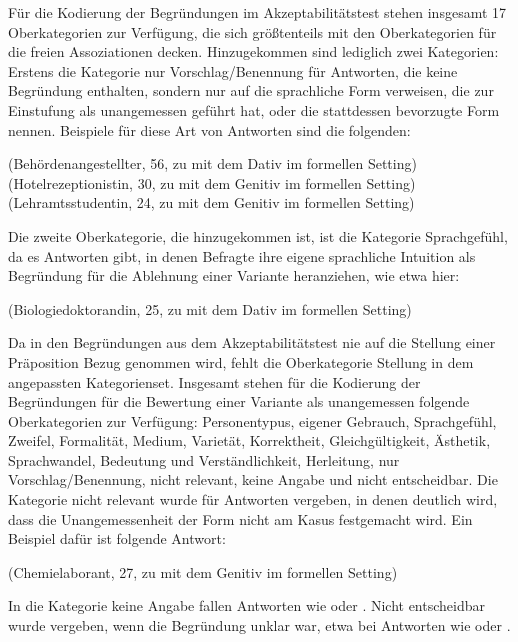 Für die Kodierung der Begründungen im Akzeptabilitätstest stehen insgesamt 17 Oberkategorien zur Verfügung, die sich größtenteils mit den Oberkategorien für die freien Assoziationen decken. 
Hinzugekommen sind lediglich zwei Kategorien:
Erstens die Kategorie \glqq nur Vorschlag/Benennung\grqq{} für Antworten, die keine Begründung enthalten, sondern nur auf die sprachliche Form verweisen, die zur Einstufung als unangemessen geführt hat, oder die stattdessen bevorzugte Form nennen. 
Beispiele für diese Art von Antworten sind die folgenden: 
\begin{exe}
\ex {} (Behördenangestellter, 56, zu \waehrend{} mit dem Dativ im formellen Setting)
\ex {} (Hotelrezeptionistin, 30, zu \dank{} mit dem Genitiv im formellen Setting)
\ex {} (Lehramtsstudentin, 24, zu \gegenueber{} mit dem Genitiv im formellen Setting)
\end{exe}
Die zweite Oberkategorie, die hinzugekommen ist, ist die Kategorie \glqq Sprachgefühl\grqq, da es Antworten gibt, in denen Befragte ihre eigene sprachliche Intuition als Begründung für die Ablehnung einer Variante heranziehen, wie etwa hier:
\begin{exe}
\ex {} (Biologiedoktorandin, 25, zu \waehrend{} mit dem Dativ im formellen Setting)
\end{exe}
Da in den Begründungen aus dem Akzeptabilitätstest nie auf die Stellung einer Präposition Bezug genommen wird, fehlt die Oberkategorie \glqq Stellung\grqq{} in dem angepassten Kategorienset. 
Insgesamt stehen für die Kodierung der Begründungen für die Bewertung einer Variante als unangemessen folgende Oberkategorien zur Verfügung: \glqq Personentypus\grqq, \glqq eigener Gebrauch\grqq, \glqq Sprachgefühl\grqq, \glqq Zweifel\grqq, \glqq Formalität\grqq, \glqq Medium\grqq, \glqq Varietät\grqq, \glqq Korrektheit\grqq, \glqq Gleichgültigkeit\grqq, \glqq Ästhetik\grqq, \glqq Sprachwandel\grqq, \glqq Bedeutung und Verständlichkeit\grqq, \glqq Herleitung\grqq, \glqq nur Vor\-schlag\slash Be\-nen\-nung\grqq, \glqq nicht relevant\grqq, \glqq keine Angabe\grqq{} und \glqq nicht entscheidbar\grqq. 
Die Kategorie \glqq nicht relevant\grqq{} wurde für Antworten vergeben, in denen deutlich wird, dass die Unangemessenheit der Form nicht am Kasus festgemacht wird. 
Ein Beispiel dafür ist folgende Antwort: 
\begin{exe}
\ex {} (Chemielaborant, 27, zu \gegenueber{} mit dem Genitiv im formellen Setting)
\end{exe}
In die Kategorie \glqq keine Angabe\grqq{} fallen Antworten wie  oder . 
\glqq Nicht entscheidbar\grqq{} wurde vergeben, wenn die Begründung unklar war, etwa bei Antworten wie  oder . 

